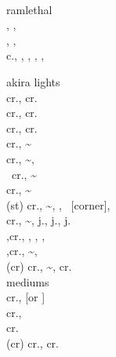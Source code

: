 \documentclass[a4paper,9pt,twocolumn]{letter}
\begin{document}
\sffamily

\noindent
\anypunch\lpunch\mpunch\hpunch\allpunch\expunch \\
\anykick\lkick\mkick\hkick\allkick\exkick \\
\vsone\vstwo\vtone\vttwo \\
\cancel\crush\air\mash \\
\btnp\btnk\btns\btnhs\btnd\bluerc\purplerc\yellowrc\redrc \\
\btnl\btnm\btnh\btnsp \\

\noindent
ramlethal \\
\down\btnk, \down\btnd, \dragonpunch\btnp \\
\down\btnk, \down\btnd, \qcb\btnp\qcb\btnp\qcb\btnp \\
c.\btns, \down\btnhs, \dragonpunch\btnp, \btnk, \forward\btnhs, \qcb\btnk

\smallbreak
\noindent
akira lights \\
cr.\lkick, cr.\lpunch\cancel\qcb\lpunch \\
cr.\lkick, cr.\lpunch\cancel\dragonpunch\hkick \\
cr.\lkick, cr.\lpunch\cancel\qcb\expunch \\
cr.\lpunch, \lpunch\~\mpunch\cancel\dragonpunch\hkick \\
cr.\lpunch, \lpunch\~\mpunch\cancel\qcb\mkick,\lkick \\\
cr.\lpunch, \lpunch\~\mpunch\cancel\qcb\hpunch \\
cr.\lpunch, \lpunch\~\mpunch\cancel\vstwo \\
(st) cr.\lpunch, \lpunch\~\mpunch\cancel\qcb\hkick, \hkick, \qcb\expunch\ [corner], \dragonpunch\exkick \\
cr.\lpunch, \lpunch\~\mpunch\cancel\vstwo\cancel\up, j.\lpunch, j.\mpunch, j. \\
\vsone,cr.\lpunch, \lpunch\mkick\cancel\qcb\hkick, \hkick, \qcf\expunch, \qcf\hpunch \\
\vsone,cr.\lpunch, \lpunch\~\mpunch\cancel\qcf\expunch, \dragonpunch\hkick \\
(cr) cr.\lpunch, \lpunch\~\mpunch\cancel\qcb\mpunch, cr.\lpunch\cancel\dragonpunch\hkick \\

\smallbreak
\noindent
mediums \\
cr.\mkick\cancel\qcb\lkick, [\lkick or \mkick] \\
cr.\mkick\cancel\qcb\exkick,\dragonpunch\hkick \\
cr.\mkick\cancel\dragonpunch\hkick \\
(cr) cr.\mkick\cancel\qcb\mpunch, cr.\lpunch\cancel\dragonpunch\hkick \\
\end{document}
